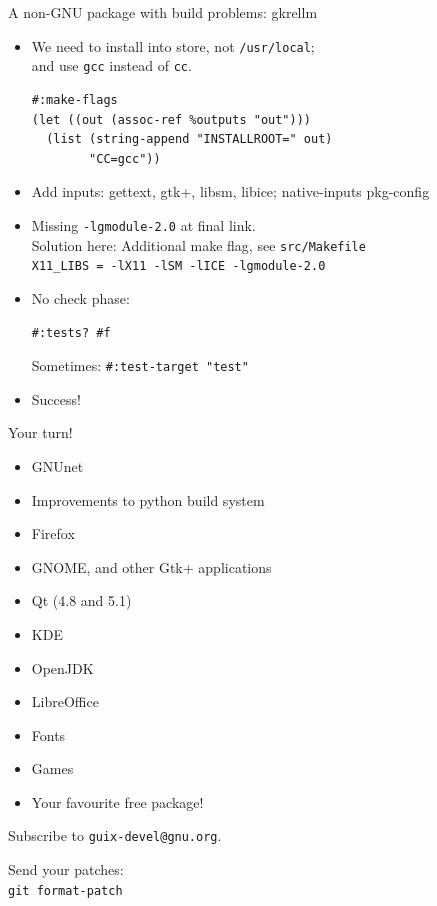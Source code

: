 \documentclass [t]{beamer}
\begin{document}
\begin{frame}[fragile]{A non-GNU package with build problems: gkrellm}
\begin {itemize}
\item
We need to install into store, not \texttt {/usr/local}; \\
and use \texttt {gcc} instead of \texttt {cc}.
\begin{verbatim}
#:make-flags
(let ((out (assoc-ref %outputs "out")))
  (list (string-append "INSTALLROOT=" out)
        "CC=gcc"))
\end{verbatim}
\pause
\item
Add inputs: gettext, gtk+, libsm, libice; native-inputs pkg-config
\pause
\item
Missing \texttt {-lgmodule-2.0} at final link. \\
Solution here: Additional make flag, see \texttt {src/Makefile} \\
\texttt {X11\_LIBS = -lX11 -lSM -lICE -lgmodule-2.0}
\pause
\item
No check phase:

\texttt {\#:tests? \#f}

Sometimes: \texttt {\#:test-target "test"}
\pause
\item
\textcolor {gruen}{Success!}
\end {itemize}
\end{frame}


\begin {frame}{Your turn!}
\begin {itemize}
\item
GNUnet
\item
Improvements to python build system
\item
Firefox
\item
GNOME, and other Gtk+ applications
\item
Qt (4.8 and 5.1)
\item
KDE
\item
OpenJDK
\item
LibreOffice
\item
Fonts
\item
Games
\item
\textcolor {gruen}{Your favourite \textcolor {rot}{free} package!}
\end {itemize}

Subscribe to \texttt {guix-devel@gnu.org}.

Send your patches: \\
\qquad \texttt {git format-patch}
\end {frame}
\end{document}
